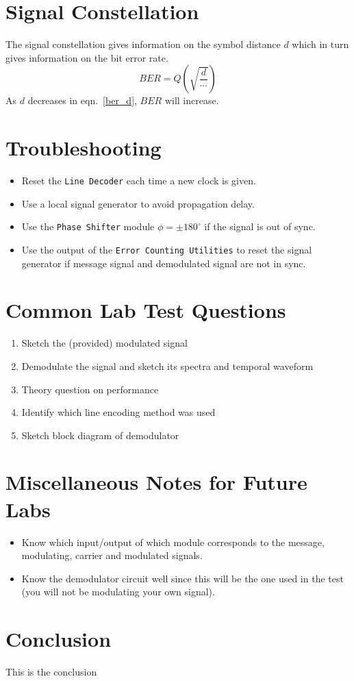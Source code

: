 \documentclass[a4paper]{article}
\begin{document}
\section{Signal Constellation}
The signal constellation gives information on the symbol distance $d$ which in turn gives information on the bit error rate. 
	\begin{equation}
		BER = Q\left(\sqrt{\frac{d}{\cdots}}\right) \label{ber_d}
	\end{equation}
As $d$ decreases in eqn.~\eqref{ber_d}, $BER$ will increase.

\section{Troubleshooting}
\begin{itemize}
	\item Reset the \texttt{Line Decoder} each time a new clock is given.
	\item Use a local signal generator to avoid propagation delay.
	\item Use the \texttt{Phase Shifter} module $\phi = \pm 180^{\circ}$ if the signal is out of sync.
	\item Use the output of the \texttt{Error Counting Utilities} to reset the signal generator if message signal and demodulated signal are not in sync.
\end{itemize}

\section{Common Lab Test Questions}
\begin{enumerate}
	\item Sketch the (provided) modulated signal
	\item Demodulate the signal and sketch its spectra and temporal waveform
	\item Theory question on performance
	\item Identify which line encoding method was used
	\item Sketch block diagram of demodulator
\end{enumerate}

\section{Miscellaneous Notes for Future Labs}
\begin{itemize}
	\item Know which input/output of which module corresponds to the message, modulating, carrier and modulated signals.
	\item Know the demodulator circuit well since this will be the one used in the test (you will not be modulating your own signal).
\end{itemize}

\section{Conclusion}
This is the conclusion
\end{document}
